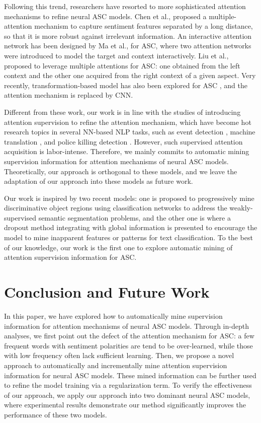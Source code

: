 \documentclass[11pt,a4paper]{article}
\begin{document}
Following this trend,
researchers have resorted to more sophisticated attention mechanisms to refine neural ASC models.
Chen et al.,  proposed a multiple-attention mechanism to capture sentiment features separated by a long distance,
so that it is more robust against irrelevant information.
An interactive attention network has been designed by Ma et al.,  for ASC,
where two attention networks were introduced to model the target and context interactively.
Liu et al.,  proposed to leverage multiple attentions for ASC:
one obtained from the left context and
the other one acquired from the right context of a given aspect.
Very recently,
transformation-based model has also been explored for ASC \cite{Li:ACL2018},
and the attention mechanism is replaced by CNN.

Different from these work,
our work is in line with the studies of introducing attention supervision to refine the attention mechanism,
which have become hot research topics in several NN-based NLP tasks, such as
event detection \cite{Liu:ACL2017},
machine translation \cite{Liu:COLING2016},
and police killing detection \cite{Nguyen:COLING2018}.
However,
such supervised attention acquisition is labor-intense.
Therefore,
we mainly commits to automatic mining supervision information for attention mechanisms of neural ASC models.
Theoretically,
our approach is orthogonal to these models,
and we leave the adaptation of our approach into these models as future work.

Our work is inspired by two recent models:
one is \cite{Wei:CVPR2017} proposed to progressively mine discriminative object regions using classification networks to address the weakly-supervised semantic segmentation problems,
and the other one is \cite{Xu:CONLL2018}
where a dropout method integrating with global information is presented to encourage the model to mine inapparent features or patterns for text classification.
To the best of our knowledge,
our work is the first one to explore automatic mining of attention supervision information for ASC.




\section{Conclusion and Future Work}
In this paper,
we have explored how to automatically mine supervision information for attention mechanisms of neural ASC models.
Through in-depth analyses,
we first point out the defect of the attention mechanism for ASC:
a few frequent words with sentiment polarities are tend to be over-learned,
while those with low frequency often lack sufficient learning.
Then,
we propose a novel approach to automatically and incrementally mine attention supervision information for neural ASC models.
These mined information can be further used to refine the model training via a regularization term.
To verify the effectiveness of our approach,
we apply our approach into two
dominant neural ASC models,
where experimental results demonstrate our method significantly improves
the performance of these two models.
\end{document}
